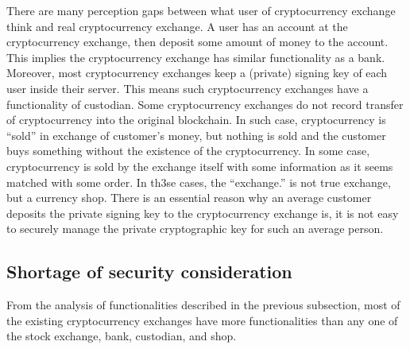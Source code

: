 There are many perception gaps between what user of cryptocurrency exchange think and real cryptocurrency exchange.
A user has an account at the cryptocurrency exchange, then deposit some amount of money to the account. This implies the cryptocurrency exchange has similar functionality as a bank. Moreover, most cryptocurrency exchanges keep a (private) signing key of each user inside their server. This means such cryptocurrency exchanges have a functionality of custodian.
Some cryptocurrency exchanges do not record transfer of cryptocurrency into
the original blockchain.
In such case, cryptocurrency is ``sold'' in exchange of customer's money, but nothing is sold and the customer buys something
without the existence of the cryptocurrency.
In some case, cryptocurrency is sold by the exchange itself with some information as it seems matched with some order.
In th3se cases, the ``exchange.''
is not true exchange, but a currency shop.
There is an essential reason why an average customer deposits the private signing key to the cryptocurrency exchange is,
it is not easy to securely manage the private cryptographic key for such an average person.


\subsection{Shortage of security consideration}
From the analysis of functionalities described in the previous subsection, most of the existing cryptocurrency exchanges
have more functionalities than any one of the stock exchange, bank, custodian, and shop.

